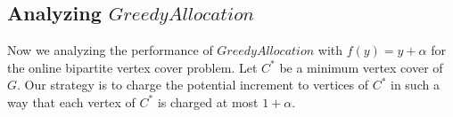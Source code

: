 \documentclass{article}
\begin{document}
%
%
%
%
%
%
%

\subsection{Analyzing $GreedyAllocation$}



Now we analyzing the performance of $GreedyAllocation$ with $f(y) = y +\alpha$ for the online bipartite vertex cover problem.
Let $C^*$ be a minimum vertex cover of $G$. Our strategy is to charge the potential increment to vertices of $C^*$ in such a way that each vertex of $C^*$ is charged at most $1+\alpha$.
\end{document}
